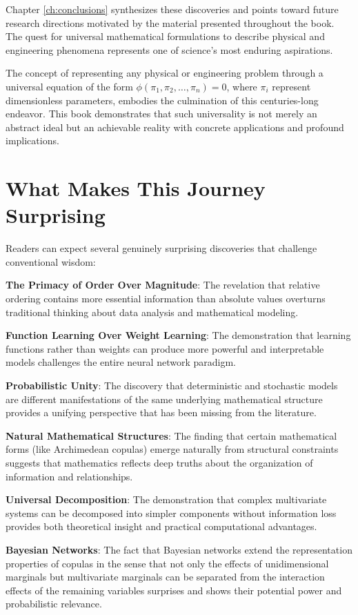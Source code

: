 \documentclass[
	11pt, %
	fleqn, %
	a4paper, %
]{LegrandOrangeBook}
\begin{document}
Chapter \ref{ch:conclusions} synthesizes these discoveries and points toward future research directions motivated by the material presented throughout the book. The quest for universal mathematical formulations to describe physical and engineering phenomena represents one of science's most enduring aspirations.

The concept of representing any physical or engineering problem through a universal equation of the form $\phi(\pi_1, \pi_2, \dots, \pi_n) = 0$, where $\pi_i$ represent dimensionless parameters, embodies the culmination of this centuries-long endeavor. This book demonstrates that such universality is not merely an abstract ideal but an achievable reality with concrete applications and profound implications.

\section{What Makes This Journey Surprising}

Readers can expect several genuinely surprising discoveries that challenge conventional wisdom:

\textbf{The Primacy of Order Over Magnitude}: The revelation that relative ordering contains more essential information than absolute values overturns traditional thinking about data analysis and mathematical modeling.

\textbf{Function Learning Over Weight Learning}: The demonstration that learning functions rather than weights can produce more powerful and interpretable models challenges the entire neural network paradigm.

\textbf{Probabilistic Unity}: The discovery that deterministic and stochastic models are different manifestations of the same underlying mathematical structure provides a unifying perspective that has been missing from the literature.

\textbf{Natural Mathematical Structures}: The finding that certain mathematical forms (like Archimedean copulas) emerge naturally from structural constraints suggests that mathematics reflects deep truths about the organization of information and relationships.

\textbf{Universal Decomposition}: The demonstration that complex multivariate systems can be decomposed into simpler components without information loss provides both theoretical insight and practical computational advantages.

\textbf{Bayesian Networks}: The fact that Bayesian networks extend the representation properties of copulas in the sense that not only the effects of unidimensional marginals but multivariate marginals can be separated from the interaction effects of the remaining variables surprises and shows their potential power and probabilistic relevance.
\end{document}

